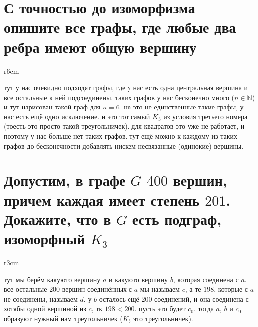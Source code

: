 \documentclass{article}
\newcommand{\N}{\mathbb{N}}
\begin{document}
  \section{С точностью до изоморфизма опишите все графы, где любые два ребра имеют общую вершину}
  \begin{wrapfigure}{r}{6cm}
    \vspace{-1cm}
    \hfill
    \vspace{-.5cm}
  \end{wrapfigure}
  тут у нас очевидно подходят графы, где у нас есть одна центральная вершина и все остальные к ней подсоединены.
  таких графов у нас бесконечно много ($n \in \N$) и тут нарисован такой граф для $n=6$.
  но это не единственные такие графы, у нас есть ещё одно исключение.
  и это тот самый $K_3$ из условия третьего номера (тоесть это просто такой треугольничек).
  для квадратов это уже не работает, и поэтому у нас больше нет таких графов.
  тут ещё можно к каждому из таких графов до бесконечности добавлять нискем несвязанные (одинокие) вершины.

  \section{Допустим, в графе $G$ $400$ вершин, причем каждая имеет степень $201$. Докажите, что в $G$ есть подграф, изоморфный $K_3$}
  \begin{wrapfigure}{r}{3cm}
    \vspace{-1cm}
    \hfill
    \vspace{-1cm}
  \end{wrapfigure}
  тут мы берём какуюто вершину $a$ и какуюто вершину $b$, которая соединена с $a$.
  все остальные $200$ вершин соединённых с $a$ мы называем $c$,
  а те $198$, которые с $a$ не соединены, называем $d$.
  у $b$ осталось ещё $200$ соединений, и она соединена с хотябы одной вершиной из $c$, тк $198 < 200$.
  пусть это будет $c_0$.
  тогда $a$, $b$ и $c_0$ образуют нужный нам треугольничек ($K_3$ это треугольничек).
\end{document}
